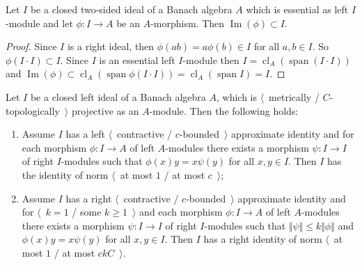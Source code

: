 \begin{lemma}\label{ImgOfAMorphFromBiIdToA} Let $I$ be a closed two-sided ideal of a
Banach algebra $A$ which is essential as left $I$-module and let $\phi:I\to A$
be an $A$-morphism. Then $\operatorname{Im}(\phi)\subset I$.
\end{lemma}
\begin{proof} Since $I$ is a right ideal, then $\phi(ab)=a\phi(b)\in I$ for all
$a,b\in I$. So $\phi(I\cdot I)\subset I$. Since $I$ is an essential left
$I$-module then $I=\operatorname{cl}_A(\operatorname{span}(I\cdot I))$ and
$\operatorname{Im}(\phi)
\subset\operatorname{cl}_A(\operatorname{span}\phi(I\cdot I))
=\operatorname{cl}_A(\operatorname{span}I)
=I$.
\end{proof}

\begin{lemma}\label{GoodIdealMetTopProjIsUnital} Let $I$ be a closed left ideal of a
Banach algebra $A$, which is $\langle$~metrically / $C$-topologically~$\rangle$
projective as an $A$-module. Then the following holds:

\begin{enumerate}[label = (\roman*)]
    \item Assume $I$ has a left $\langle$~contractive / $c$-bounded~$\rangle$
    approximate identity and for each  morphism $\phi:I\to A$ of left
    $A$-modules there exists a morphism $\psi:I\to I$ of right $I$-modules such
    that $\phi(x)y=x\psi(y)$ for all $x,y\in I$. Then $I$ has the identity of
    norm $\langle$~at most $1$ / at most $c$~$\rangle$;

    \item Assume $I$ has a right $\langle$~contractive / $c$-bounded~$\rangle$
    approximate identity and for $\langle$~$k=1$ / some $k\geq 1$~$\rangle$ and
    each morphism $\phi:I\to A$ of left $A$-modules there exists a morphism
    $\psi:I\to I$ of right $I$-modules such that $\Vert\psi\Vert\leq
    k\Vert\phi\Vert$ and $\phi(x)y=x\psi(y)$ for all $x,y\in I$. Then $I$ has a
    right identity of norm $\langle$~at most $1$ / at most $ckC$~$\rangle$.
\end{enumerate}
\end{lemma} 
